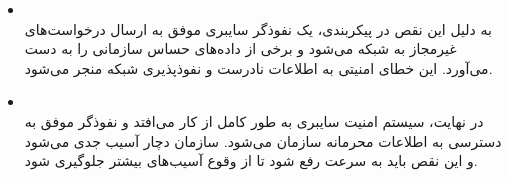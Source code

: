 \begin{qsolve}
\begin{enumerate}
\begin{itemize}
			\item {}\\
			به دلیل این نقص در پیکربندی، یک نفوذگر سایبری موفق به ارسال درخواست‌های غیرمجاز به شبکه می‌شود و برخی از داده‌های حساس سازمانی را به دست می‌آورد. این خطای امنیتی به اطلاعات نادرست و نفوذپذیری شبکه منجر می‌شود.
			
			\item {}\\
			در نهایت، سیستم امنیت سایبری به طور کامل از کار می‌افتد و نفوذگر موفق به دسترسی به اطلاعات محرمانه سازمان می‌شود. سازمان دچار آسیب جدی می‌شود و این نقص باید به سرعت رفع شود تا از وقوع آسیب‌های بیشتر جلوگیری شود.
		\end{itemize}
		
	\end{enumerate} 
\end{qsolve}